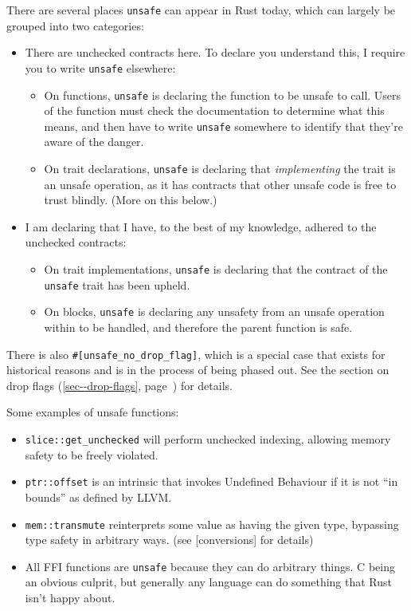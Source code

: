 \documentclass[a4paper,]{book}
\renewcommand*{\hyperref}[2][\ar]{%
  \def\ar{#2}%
  #2 (\autoref{#1}, page~\pageref{#1})}
\providecommand{\tightlist}{%
  \setlength{\itemsep}{0pt}\setlength{\parskip}{0pt}}
\begin{document}
There are several places \texttt{unsafe} can appear in Rust today, which
can largely be grouped into two categories:

\begin{itemize}
\tightlist
\item
  There are unchecked contracts here. To declare you understand this, I
  require you to write \texttt{unsafe} elsewhere:

  \begin{itemize}
  \tightlist
  \item
    On functions, \texttt{unsafe} is declaring the function to be unsafe
    to call. Users of the function must check the documentation to
    determine what this means, and then have to write \texttt{unsafe}
    somewhere to identify that they're aware of the danger.
  \item
    On trait declarations, \texttt{unsafe} is declaring that
    \emph{implementing} the trait is an unsafe operation, as it has
    contracts that other unsafe code is free to trust blindly. (More on
    this below.)
  \end{itemize}
\item
  I am declaring that I have, to the best of my knowledge, adhered to
  the unchecked contracts:

  \begin{itemize}
  \tightlist
  \item
    On trait implementations, \texttt{unsafe} is declaring that the
    contract of the \texttt{unsafe} trait has been upheld.
  \item
    On blocks, \texttt{unsafe} is declaring any unsafety from an unsafe
    operation within to be handled, and therefore the parent function is
    safe.
  \end{itemize}
\end{itemize}

There is also \texttt{\#{[}unsafe\_no\_drop\_flag{]}}, which is a
special case that exists for historical reasons and is in the process of
being phased out. See the section on \hyperref[sec--drop-flags]{drop
flags} for details.

Some examples of unsafe functions:

\begin{itemize}
\tightlist
\item
  \texttt{slice::get\_unchecked} will perform unchecked indexing,
  allowing memory safety to be freely violated.
\item
  \texttt{ptr::offset} is an intrinsic that invokes Undefined Behaviour
  if it is not ``in bounds'' as defined by LLVM.
\item
  \texttt{mem::transmute} reinterprets some value as having the given
  type, bypassing type safety in arbitrary ways. (see {[}conversions{]}
  for details)
\item
  All FFI functions are \texttt{unsafe} because they can do arbitrary
  things. C being an obvious culprit, but generally any language can do
  something that Rust isn't happy about.
\end{itemize}
\end{document}
